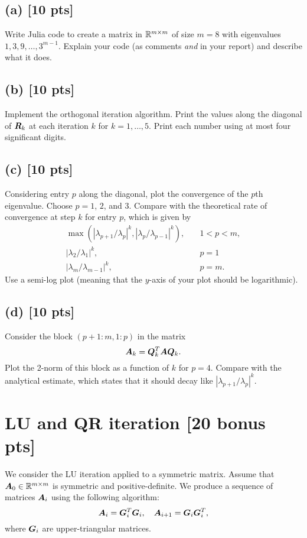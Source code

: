 \documentclass[twoside,10pt]{article}
\begin{document}
  \subsection*{(a) [10 pts]} 
    Write Julia code to create a matrix in $\mathbb{R}^{m \times m}$ of size $m = 8$ with eigenvalues $1, 3, 9, \ldots, 3^{m -1}$. 
    Explain your code (as comments \emph{and} in your report) and describe what it does.

  \subsection*{(b) [10 pts]}
    Implement the orthogonal iteration algorithm. Print the values along the diagonal of $\bm{R}_{k}$ at each iteration $k$ for $k = 1, \ldots,5$. Print each number using at most four significant digits. 
  
  \subsection*{(c) [10 pts]}
    Considering entry $p$ along the diagonal, plot the convergence of the $p$th eigenvalue. 
    Choose $p = 1$, $2$, and $3$.  
    Compare with the theoretical rate of convergence at step $k$ for entry $p$, which is given by 
    \begin{align}
      \max(|\lambda_{p + 1} / \lambda_p|^k, |\lambda_p / \lambda_{p -1}|^k), \quad &1 < p < m,\\
      |\lambda_2 / \lambda_1|^k, \quad &p = 1\\
      |\lambda_{m} / \lambda_{m -1}|^k, \quad &p = m.
    \end{align}
    Use a semi-log plot (meaning that the $y$-axis of your plot should be logarithmic). 
  
  \subsection*{(d) [10 pts]}
    Consider the block $(p + 1 : m, 1 : p)$ in the matrix 
    \begin{equation}
      \bm{A}_k = \bm{Q}^T_{k} \bm{A} \bm{Q}_{k}.
    \end{equation}
    Plot the 2-norm of this block as a function of $k$ for $p = 4$. Compare with the analytical estimate, which states that it should decay like $|\lambda_{p + 1} / \lambda_p|^k$.


\section{LU and QR iteration [20 bonus pts]}
We consider the LU iteration applied to a symmetric matrix. Assume that $\bm{A}_0 \in \mathbb{R}^{m \times m}$ is symmetric and positive-definite. 
We produce a sequence of matrices $\bm{A}_i$ using the following algorithm:
\begin{equation}
  \bm{A}_i = \bm{G}^T_i \bm{G}_i, \quad \bm{A}_{i + 1} = \bm{G}_i \bm{G}_i^T, 
\end{equation}
where $\bm{G}_i$ are upper-triangular matrices.
\end{document}
